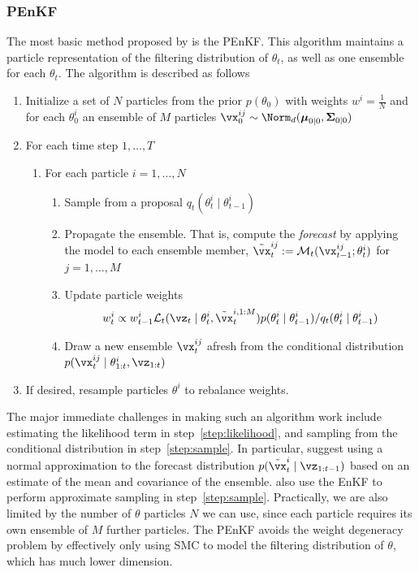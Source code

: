 \documentclass[12pt]{article}
\begin{document}
\subsubsection{PEnKF}
The most basic method proposed by \cite{katzfuss2020} is the
PEnKF. This algorithm maintains a
particle representation of the filtering distribution of $\theta_t$, as well as 
one ensemble for each $\theta_t$. The algorithm is described as follows
\begin{enumerate}
    \item Initialize a set of $N$ particles from the prior $p(\theta_0)$ with weights
    $w^i = \frac 1 N$ and for each $\theta_0^i$ an ensemble of $M$ particles
    $\vx_0^{ij} \sim \Norm_d(\boldsymbol\mu_{0|0}, \mathbf\Sigma_{0|0})$
    \item For each time step $1, \ldots, T$
    \begin{enumerate}
        \item For each particle $i = 1, \ldots, N$
        \begin{enumerate}
            \item Sample from a proposal $q_t(\theta^i_t \mid \theta^i_{t-1})$
            \item Propagate the ensemble. That is, compute the \emph{forecast}
            by applying the model to each ensemble member,
            $\tilde \vx^{ij}_{t} := \mathcal M_t(\vx^{ij}_{t-1}; \theta_t^i)$
            for $j = 1, \ldots, M$
            \item Update particle weights
            \begin{align}
                w^i_t \propto w^i_{t-1}\mathcal L_t(\vz_t \mid \theta_t^i, \tilde\vx^{i,1:M}_t)
                p(\theta_t^i \mid \theta_{t-1}^i)/q_t(\theta_t^i \mid \theta_{t-1}^i)
            \end{align}\label{step:likelihood}
            \item Draw a new ensemble $\vx^{ij}_t$ afresh from the conditional distribution
            $p(\vx^{ij}_t \mid \theta^i_{1:t}, \vz_{1:t})$ \label{step:sample}
        \end{enumerate}
    \end{enumerate}
    \item If desired, resample particles $\theta^i$ to rebalance weights.
\end{enumerate}
The major immediate challenges in making such an algorithm work include
estimating the likelihood term in step~\ref{step:likelihood}, and sampling from
the conditional distribution in step~\ref{step:sample}. In particular,
\cite{katzfuss2020} suggest using a normal approximation to the forecast
distribution $p(\tilde\vx^i_t \mid \vz_{1:t-1})$ based on an estimate of the mean
and covariance of the ensemble. \cite{katzfuss2020} also use the EnKF to perform
approximate sampling in step~\ref{step:sample}. Practically, we are also limited by
the number of $\theta$ particles $N$ we can use, since each particle requires
its own ensemble of $M$ further particles. The PEnKF avoids the weight
degeneracy problem by effectively only using SMC to model the filtering
distribution of $\theta$, which has much lower dimension.
\end{document}
